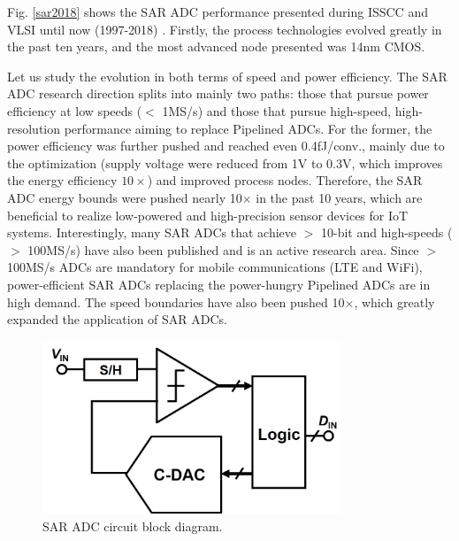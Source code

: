 Fig. \ref{sar2018} shows the SAR ADC performance presented during ISSCC and VLSI until now (1997-2018) \cite{MurmanADC}.
Firstly, the process technologies evolved greatly in the past ten years, and the most advanced node presented was 14nm CMOS.

Let us study the evolution in both terms of speed and power efficiency.
The SAR ADC research direction splits into mainly two paths: those that pursue power efficiency at low speeds ($<$ 1MS/s) and those that pursue high-speed, high-resolution performance aiming to replace Pipelined ADCs. 
For the former, the power efficiency was further pushed and reached even 0.4fJ/conv., mainly due to the optimization (supply voltage were reduced from 1V to 0.3V, which improves the energy efficiency $10\times$) and improved process nodes.
Therefore, the SAR ADC energy bounds were pushed nearly 10$\times$ in the past 10 years, which are beneficial to  realize low-powered and high-precision sensor devices for IoT systems.
Interestingly, many SAR ADCs that achieve $>$ 10-bit and high-speeds ($>$ 100MS/s) have also been published and is an active research area.
Since $>$ 100MS/s ADCs are mandatory for mobile communications (LTE and WiFi), power-efficient SAR ADCs replacing the power-hungry Pipelined ADCs are in high demand.
The speed boundaries have also been pushed 10$\times$, which greatly expanded the application of SAR ADCs.

\begin{figure}[!]
\centering
  \includegraphics[width=0.8\textwidth]{figure/chap1/ch1-sar-block.jpg}
  \caption{SAR ADC circuit block diagram.}
  \label{sarblock}
\end{figure}

